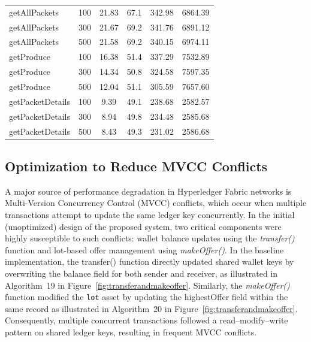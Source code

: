 \documentclass[12pt]{article}
\begin{document}
\begin{table}[h]
{\begin{tabular}{|l|c|c|c|c|c|}
				getAllPackets & 100 & 21.83 & 67.1 & 342.98 & 6864.39 \\
				getAllPackets & 300 & 21.67 & 69.2 & 341.76 & 6891.12 \\
				getAllPackets & 500 & 21.58 & 69.2 & 340.15 & 6974.11 \\
				\hline
				
				getProduce & 100 & 16.38 & 51.4 & 337.29 & 7532.89 \\
				getProduce & 300 & 14.34 & 50.8 & 324.58 & 7597.35 \\
				getProduce & 500 & 12.04 & 51.1 & 305.59 & 7657.60 \\
				\hline
				
				getPacketDetails & 100 & 9.39 & 49.1 & 238.68 & 2582.57 \\
				getPacketDetails & 300 & 8.94 & 49.8 & 234.48 & 2585.68 \\
				getPacketDetails & 500 & 8.43 & 49.3 & 231.02 & 2586.68 \\
				\hline
				
			\end{tabular}
		}
		\label{tab:resource-combined}
	\end{table}
	
	
	\subsection{Optimization to Reduce MVCC Conflicts}
	
	A major source of performance degradation in Hyperledger Fabric networks is 
	Multi-Version Concurrency Control (MVCC) conflicts, which occur when multiple 
	transactions attempt to update the same ledger key concurrently. In the initial 
	(unoptimized) design of the proposed system, two critical components were highly 
	susceptible to such conflicts: wallet balance updates using the \textit{transfer()} 
	function and lot-based offer management using \textit{makeOffer()}. In the baseline implementation, the transfer() function directly updated 
	shared wallet keys by overwriting the balance field for both sender and receiver, 
	as illustrated in Algorithm~19 in Figure~\ref{fig:transferandmakeoffer}. 
	Similarly, the \textit{makeOffer()} function modified the \texttt{lot} asset by 
	updating the highestOffer field within the same record as illustrated in Algorithm~20 in Figure~\ref{fig:transferandmakeoffer}. Consequently, 
	multiple concurrent transactions followed a read–modify–write pattern on shared 
	ledger keys, resulting in frequent MVCC conflicts.
	
\end{document}
